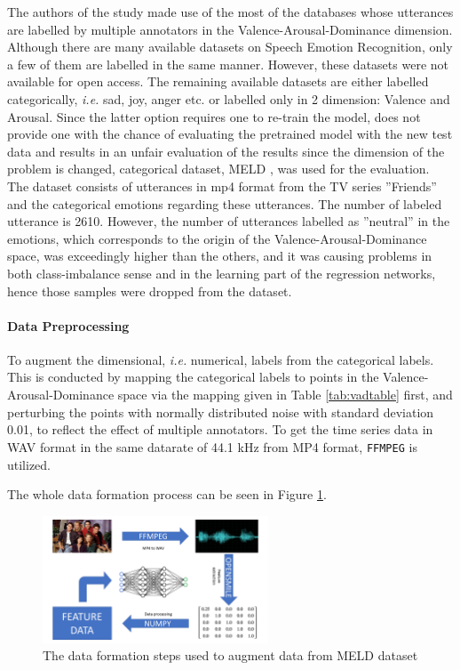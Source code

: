 \documentclass[a4paper,11pt]{article}
\begin{document}
The authors of the study made use of the most of the databases whose utterances are labelled by multiple annotators in the Valence-Arousal-Dominance dimension. 
Although there are many available datasets on Speech Emotion Recognition, only a few of them are labelled in the same manner. However, these datasets were not available for open access. The remaining available datasets are either labelled categorically, \textit{i.e.} sad, joy, anger etc. or labelled only in 2 dimension: Valence and Arousal. Since the latter option requires one to re-train the model, does not provide one with the chance of evaluating the pretrained model with the new test data and results in an unfair evaluation of the results since the dimension of the problem is changed, categorical dataset, MELD \cite{atmaja2020deep}, was used for the evaluation. The dataset consists of utterances in mp4 format from the TV series ''Friends'' and the categorical emotions regarding these utterances. The number of labeled utterance is 2610. However, the number of utterances labelled as ''neutral'' in the emotions, which corresponds to the origin of the Valence-Arousal-Dominance space, was exceedingly higher than the others, and it was causing problems in both class-imbalance sense and in the learning part of the regression networks, hence those samples were dropped from the dataset.

\paragraph{Data Preprocessing}

To augment the dimensional, \textit{i.e.} numerical, labels from the categorical labels. This is conducted by mapping the categorical labels to points in the Valence-Arousal-Dominance space via the mapping given in Table \ref{tab:vadtable} first, and perturbing the points with normally distributed noise with standard deviation 0.01, to reflect the effect of multiple annotators. To get the time series data in WAV format in the same datarate of 44.1 kHz from MP4 format, \texttt{FFMPEG} is utilized.   

The whole data formation process can be seen in Figure \ref{fig:dataformation}.

\begin{figure}[h]
\centering
\includegraphics[width=0.6\textwidth]{Presentation.png}
\caption{The data formation steps used to augment data from MELD dataset}\label{fig:dataformation}
\end{figure}
\end{document}
